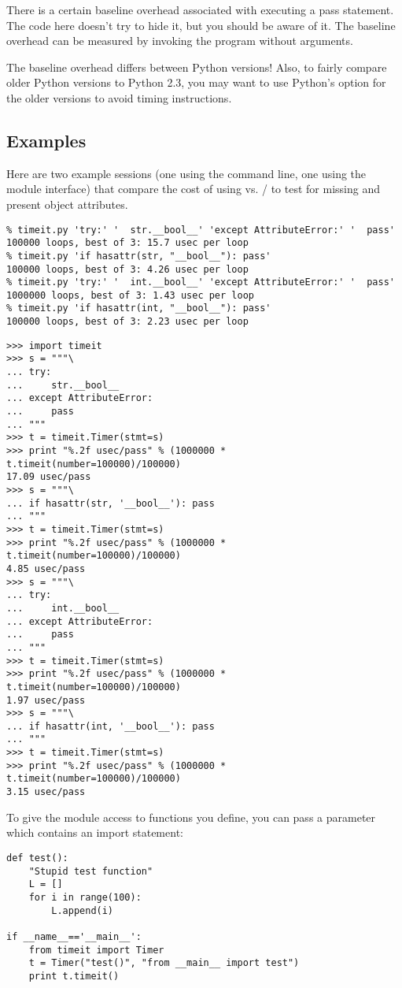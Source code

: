 \begin{notice}
  There is a certain baseline overhead associated with executing a
  pass statement.  The code here doesn't try to hide it, but you
  should be aware of it.  The baseline overhead can be measured by
  invoking the program without arguments.
\end{notice}

The baseline overhead differs between Python versions!  Also, to
fairly compare older Python versions to Python 2.3, you may want to
use Python's  option for the older versions to avoid
timing  instructions.

\subsection{Examples}

Here are two example sessions (one using the command line, one using
the module interface) that compare the cost of using
 vs. / to test for
missing and present object attributes.

\begin{verbatim}
% timeit.py 'try:' '  str.__bool__' 'except AttributeError:' '  pass'
100000 loops, best of 3: 15.7 usec per loop
% timeit.py 'if hasattr(str, "__bool__"): pass'
100000 loops, best of 3: 4.26 usec per loop
% timeit.py 'try:' '  int.__bool__' 'except AttributeError:' '  pass'
1000000 loops, best of 3: 1.43 usec per loop
% timeit.py 'if hasattr(int, "__bool__"): pass'
100000 loops, best of 3: 2.23 usec per loop
\end{verbatim}

\begin{verbatim}
>>> import timeit
>>> s = """\
... try:
...     str.__bool__
... except AttributeError:
...     pass
... """
>>> t = timeit.Timer(stmt=s)
>>> print "%.2f usec/pass" % (1000000 * t.timeit(number=100000)/100000)
17.09 usec/pass
>>> s = """\
... if hasattr(str, '__bool__'): pass
... """
>>> t = timeit.Timer(stmt=s)
>>> print "%.2f usec/pass" % (1000000 * t.timeit(number=100000)/100000)
4.85 usec/pass
>>> s = """\
... try:
...     int.__bool__
... except AttributeError:
...     pass
... """
>>> t = timeit.Timer(stmt=s)
>>> print "%.2f usec/pass" % (1000000 * t.timeit(number=100000)/100000)
1.97 usec/pass
>>> s = """\
... if hasattr(int, '__bool__'): pass
... """
>>> t = timeit.Timer(stmt=s)
>>> print "%.2f usec/pass" % (1000000 * t.timeit(number=100000)/100000)
3.15 usec/pass
\end{verbatim}

To give the \module{timeit} module access to functions you
define, you can pass a  parameter which contains an import
statement:

\begin{verbatim}
def test():
    "Stupid test function"
    L = []
    for i in range(100):
        L.append(i)

if __name__=='__main__':
    from timeit import Timer
    t = Timer("test()", "from __main__ import test")
    print t.timeit()
\end{verbatim}
